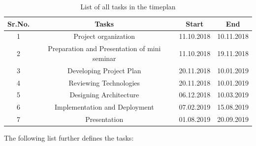 \begin{table}
\centering
	\begin{tabular}{|c|c|c|c|}
	\hline
		Sr.No. & Tasks & Start & End\\
		\hline
		1 &	Project organization & 11.10.2018 &	10.11.2018\\
		\hline
		2 &	Preparation and Presentation of mini seminar & 11.10.2018 &	19.11.2018\\
		\hline
		3 &	Developing Project Plan & 20.11.2018 & 10.01.2019\\
		\hline
		4 &	Reviewing Technologies & 20.11.2018 & 10.01.2019\\
		\hline
		5 &	Designing Architecture &	06.12.2018 & 10.03.2019\\
		\hline
		6 & Implementation and Deployment &	07.02.2019 & 15.08.2019\\
		\hline
		7 & Presentation &	01.08.2019 & 20.09.2019\\
		\hline
	\end{tabular}
\caption{List of all tasks in the timeplan}
\end{table}
The following list further defines the tasks: 
